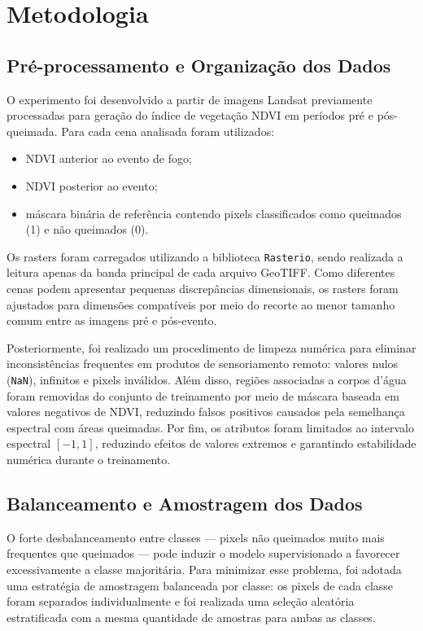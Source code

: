 \documentclass[conference]{IEEEtran}
\begin{document}
\section{Metodologia}

\subsection{Pré-processamento e Organização dos Dados}

O experimento foi desenvolvido a partir de imagens Landsat previamente
processadas para geração do índice de vegetação NDVI em períodos pré e
pós-queimada. Para cada cena analisada foram utilizados:

\begin{itemize}
  \item NDVI anterior ao evento de fogo;
  \item NDVI posterior ao evento;
  \item máscara binária de referência contendo pixels classificados como
        queimados (1) e não queimados (0).
\end{itemize}

Os rasters foram carregados utilizando a biblioteca \texttt{Rasterio},
sendo realizada a leitura apenas da banda principal de cada arquivo GeoTIFF.
Como diferentes cenas podem apresentar pequenas discrepâncias dimensionais,
os rasters foram ajustados para dimensões compatíveis por meio do recorte ao
menor tamanho comum entre as imagens pré e pós-evento.

Posteriormente, foi realizado um procedimento de limpeza numérica para
eliminar inconsistências frequentes em produtos de sensoriamento remoto:
valores nulos (\texttt{NaN}), infinitos e pixels inválidos. Além disso,
regiões associadas a corpos d'água foram removidas do conjunto de
treinamento por meio de máscara baseada em valores negativos de NDVI,
reduzindo falsos positivos causados pela semelhança espectral com áreas
queimadas. Por fim, os atributos foram limitados ao intervalo espectral
$[-1, 1]$, reduzindo efeitos de valores extremos e garantindo estabilidade
numérica durante o treinamento.

\subsection{Balanceamento e Amostragem dos Dados}

O forte desbalanceamento entre classes — pixels não queimados muito mais
frequentes que queimados — pode induzir o modelo supervisionado a favorecer
excessivamente a classe majoritária. Para minimizar esse problema, foi
adotada uma estratégia de amostragem balanceada por classe: os pixels de
cada classe foram separados individualmente e foi realizada uma seleção
aleatória estratificada com a mesma quantidade de amostras para ambas as
classes.
\end{document}
